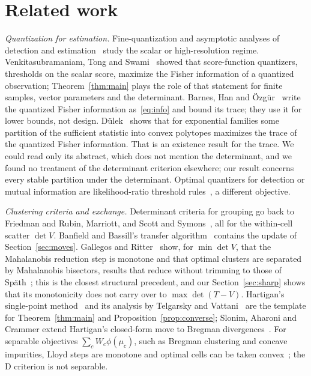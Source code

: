 \documentclass[11pt]{amsart}
\theoremstyle{definition}
\theoremstyle{remark}
\begin{document}
\section{Related work}\label{sec:related}

\emph{Quantization for estimation.} Fine-quantization and asymptotic analyses of detection and
estimation~\cite{poor1988,benitz1989,gubner1993} study the scalar or high-resolution regime.
Venkitasubramaniam, Tong and Swami~\cite{venkitasubramaniam2006,venkitasubramaniam2007} showed that
score-function quantizers, thresholds on the scalar score, maximize the Fisher information of a
quantized observation; Theorem~\ref{thm:main} plays the role of that statement for finite
samples, vector parameters and the determinant. Barnes, Han and \"Ozg\"ur~\cite{barnes2018,barnes2020} write the
quantized Fisher information as~\eqref{eq:info} and bound its trace; they use it for lower
bounds, not design. D\"ulek~\cite{dulek2023} shows that for exponential families some partition
of the sufficient statistic into convex polytopes maximizes the trace of the quantized Fisher
information. That is an existence result for the trace. We could read only its abstract, which
does not mention the determinant, and we found no treatment of the determinant criterion
elsewhere; our result concerns every stable partition under the determinant. Optimal quantizers for detection or mutual information are
likelihood-ratio threshold rules~\cite{tsitsiklis1993,kurkoski2014}, a different objective.

\emph{Clustering criteria and exchange.} Determinant criteria for grouping go back to Friedman and
Rubin, Marriott, and Scott and Symons~\cite{friedman1967,marriott1971,scott1971}, all for the
within-cell scatter $\det V$. Banfield and Bassill's transfer algorithm~\cite{banfield1977} contains
the update of Section~\ref{sec:moves}. Gallegos and Ritter~\cite{gallegos2005} show, for
$\min\det V$, that the Mahalanobis reduction step is monotone and that optimal clusters are
separated by Mahalanobis bisectors, results that reduce without trimming to those of
Sp\"ath~\cite{spath1985}; this is the closest structural precedent, and our
Section~\ref{sec:sharp} shows that its monotonicity does not carry over to $\max\det(T-V)$.
Hartigan's single-point method~\cite{hartigan1975,hartigan1979} and its analysis by Telgarsky and
Vattani~\cite{telgarsky2010} are the template for Theorem~\ref{thm:main} and
Proposition~\ref{prop:converse}; Slonim, Aharoni and Crammer extend Hartigan's closed-form move to
Bregman divergences~\cite{slonim2013}. For separable objectives $\sum_cW_c\phi(\mu_c)$, such as Bregman
clustering and concave impurities, Lloyd steps are monotone and optimal cells can be taken
convex~\cite{banerjee2005,burshtein1992,chou1991}; the D criterion is not separable.
\end{document}
